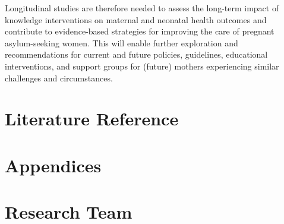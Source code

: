 \documentclass[12pt]{article}
\begin{document}
\noindent Longitudinal studies are therefore needed to assess the long-term impact of knowledge interventions on maternal and neonatal health outcomes and contribute to evidence-based strategies for improving the care of pregnant asylum-seeking women. This will enable further exploration and recommendations for current and future policies, guidelines, educational interventions, and support groups for (future) mothers experiencing similar challenges and circumstances. \\

\newpage
\section{Literature Reference}

\newpage
\centerline{\textbf{ }}

\newpage


\newpage

\newpage

\newpage
\section{Appendices}

\newpage
\centerline{\textbf{ }}

\newpage
\centerline{\textbf{ }}

\newpage

\newpage
\centerline{\textbf{ }}

\newpage
\section{Research Team}
\newpage
\centerline{\textbf{ }}
\end{document}
